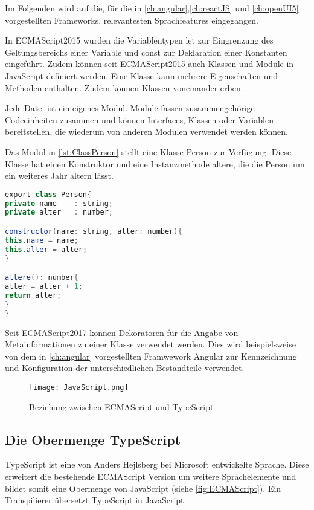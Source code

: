 Im Folgenden wird auf die, für die in \autoref{ch:angular},\ref{ch:reactJS} und \ref{ch:openUI5} vorgestellten Frameworks, relevantesten Sprachfeatures eingegangen.  

In ECMAScript2015 wurden die Variablentypen let zur Eingrenzung des Geltungsbereichs einer Variable und const zur Deklaration einer Konstanten eingeführt. Zudem können seit ECMAScript2015 auch Klassen und Module in JavaScript definiert werden. Eine Klasse kann mehrere Eigenschaften und Methoden enthalten. Zudem können Klassen voneinander erben.

Jede Datei ist ein eigenes Modul. Module fassen zusammengehörige Codeeinheiten zusammen und können Interfaces, Klassen oder Variablen bereitstellen, die wiederum von anderen Modulen verwendet werden können.\autocites[vgl.][34\psq]{Woiwode.2018}[vgl.][19\psqq]{Steyer.2017}

Das Modul in \autoref{lst:ClassPerson} stellt eine Klasse Person zur Verfügung. Diese Klasse hat einen Konstruktor und eine Instanzmethode altere, die die Person um ein weiteres Jahr altern lässt.

\begin{lstlisting}[caption=Eine Klasse Person wird von einem Modul bereitgestellt , label=lst:ClassPerson, language=Java]
export class Person{
private name 	: string;
private alter 	: number;

constructor(name: string, alter: number){
this.name = name;
this.alter = alter;
}

altere(): number{
alter = alter + 1;
return alter;
}
}
\end{lstlisting}

Seit ECMAScript2017 können Dekoratoren für die Angabe von Metainformationen zu einer Klasse verwendet werden. Dies wird beispielsweise von dem in \autoref{ch:angular} vorgestellten Framwework Angular zur Kennzeichnung und Konfiguration der unterschiedlichen Bestandteile verwendet.\autocites[vgl.][30\psqq]{Woiwode.2018} 

\begin{figure}[h]
	\centering
	\texttt{[image: JavaScript.png]}
	\caption{Beziehung zwischen ECMAScript und TypeScript} 
	\label{fig:ECMAScript}
\end{figure}

\subsection{Die Obermenge TypeScript}
TypeScript ist eine von Anders Hejlsberg bei Microsoft entwickelte Sprache. Diese erweitert die bestehende ECMAScript Version um weitere Sprachelemente und bildet somit eine Obermenge von JavaScript (siehe \autoref{fig:ECMAScript}). Ein Transpilierer übersetzt TypeScript in JavaScript. 

